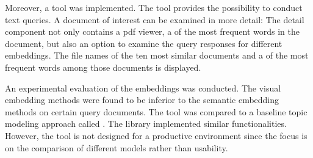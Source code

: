 Moreover, a tool was implemented.
The tool provides the possibility to conduct text queries.
A document of interest can be examined in more detail:
The detail component not only contains a \ac{pdf} viewer, 
a \wordcloud{} of the most frequent words in the document, but also an option to examine the query responses for different embeddings.
The file names of the ten most similar documents and a \wordcloud{} of the most frequent words among those documents is displayed.

An experimental evaluation of the embeddings was conducted.
The visual embedding methods were found to be inferior to the semantic embedding methods on certain query documents.
The tool was compared to a baseline topic modeling approach called \topTwovec{}.
The library \topTwovec{} implemented similar functionalities.
However, the tool is not designed for a productive environment since the focus is on the comparison of different models rather than usability.